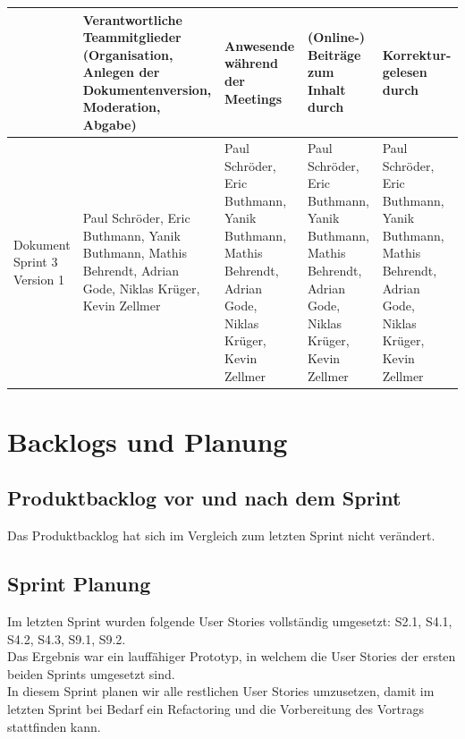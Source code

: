 \documentclass[a4paper,11pt]{article}
\begin{document}
\begin{table}[h]
	\centering
	\footnotesize
	\begin{tabular}{| p{1.5cm} | p{2.5cm} | p{2cm} | p{2cm} | p{2cm} |}
		\hline
		                            & Verantwortliche Teammitglieder (Organisation, Anlegen der Dokumentenversion, Moderation, Abgabe)         & Anwesende während der Meetings                                                                           & (Online-) Beiträge zum Inhalt durch                                                                      & Korrektur-gelesen durch                                                                                  \\
		\hline
		Dokument Sprint 3 Version 1 & Paul Schröder, Eric Buthmann, Yanik Buthmann, Mathis Behrendt, Adrian Gode, Niklas Krüger, Kevin Zellmer & Paul Schröder, Eric Buthmann, Yanik Buthmann, Mathis Behrendt, Adrian Gode, Niklas Krüger, Kevin Zellmer & Paul Schröder, Eric Buthmann, Yanik Buthmann, Mathis Behrendt, Adrian Gode, Niklas Krüger, Kevin Zellmer & Paul Schröder, Eric Buthmann, Yanik Buthmann, Mathis Behrendt, Adrian Gode, Niklas Krüger, Kevin Zellmer \\
		\hline
	\end{tabular}
\end{table}

\section{Backlogs und Planung}

\subsection{Produktbacklog vor und nach dem Sprint}
Das Produktbacklog hat sich im Vergleich zum letzten Sprint nicht verändert.

\subsection{Sprint Planung}
Im letzten Sprint wurden folgende User Stories vollständig umgesetzt: S2.1, S4.1, S4.2, S4.3, S9.1, S9.2. \\
Das Ergebnis war ein lauffähiger Prototyp, in welchem die User Stories der ersten beiden Sprints umgesetzt sind.\\
In diesem Sprint planen wir alle restlichen User Stories umzusetzen, damit im letzten Sprint bei Bedarf ein Refactoring und die Vorbereitung des Vortrags stattfinden kann.
\end{document}
